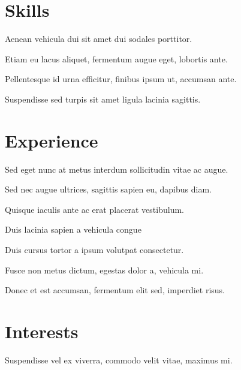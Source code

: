 \documentclass[sidebar]{mjresume}
\begin{document}
\begin{main}
	\section{Skills}
	
	\begin{bullets}
		\item Aenean vehicula dui sit amet dui sodales porttitor.
		\item Etiam eu lacus aliquet, fermentum augue eget, lobortis ante.
		\item Pellentesque id urna efficitur, finibus ipsum ut, accumsan ante.
		\item Suspendisse sed turpis sit amet ligula lacinia sagittis.
	\end{bullets}
	
	\section{Experience}
	
	\begin{bullets}
		\item Sed eget nunc at metus interdum sollicitudin vitae ac augue.
		\item Sed nec augue ultrices, sagittis sapien eu, dapibus diam.
		\item Quisque iaculis ante ac erat placerat vestibulum.
		\item Duis lacinia sapien a vehicula congue
	\end{bullets}
	
	\begin{bullets}
		\item Duis cursus tortor a ipsum volutpat consectetur.
		\item Fusce non metus dictum, egestas dolor a, vehicula mi.
		\item Donec et est accumsan, fermentum elit sed, imperdiet risus.
	\end{bullets}
	
	
	\section{Interests}
	
	\begin{bullets}
		\item Suspendisse vel ex viverra, commodo velit vitae, maximus mi.
	\end{bullets}
	

\end{main}
\end{document}
